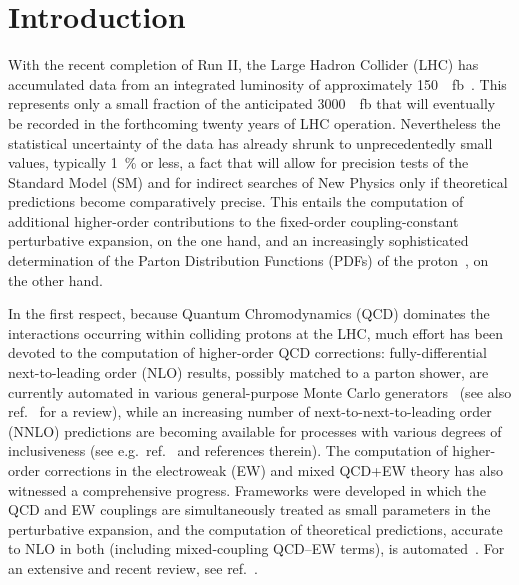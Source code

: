 \section{Introduction}
\label{sec:introduction}

With the recent completion of Run II, the Large Hadron Collider (LHC) has 
accumulated data from an integrated luminosity of approximately 
\SI{150}{\per\femto\barn}~\cite{Mangano:2020icy}. This represents only a small fraction of
the anticipated \SI{3000}{\per\femto\barn} that will eventually be recorded in the
forthcoming twenty years of LHC operation. Nevertheless the statistical 
uncertainty of the data has already shrunk to unprecedentedly small values,
typically \SI{1}{\percent} or less, a fact that will allow for precision tests of the
Standard Model (SM) and for indirect searches of New Physics only if 
theoretical predictions become comparatively precise. This entails the 
computation of additional higher-order contributions to the fixed-order 
coupling-constant perturbative expansion, on the one hand, and an increasingly 
sophisticated determination of the Parton Distribution Functions (PDFs) of the 
proton~\cite{Gao:2017yyd,Ethier:2020way}, on the other hand. 

In the first respect, because Quantum Chromodynamics (QCD) dominates the 
interactions occurring within colliding protons at the LHC, much effort 
has been devoted to the computation of higher-order QCD corrections: 
fully-differential next-to-leading order (NLO) results, possibly matched to a
parton shower, are currently automated in various general-purpose
Monte Carlo generators~\cite{Gleisberg:2008ta,Alwall:2014hca,Bellm:2015jjp}
(see also ref.~\cite{Buckley:2011ms} for a review),
while an increasing number of next-to-next-to-leading order (NNLO) predictions 
are becoming available for processes with various degrees of inclusiveness
(see e.g.\ ref.~\cite{Amoroso:2020lgh} and references therein). The computation
of higher-order corrections in the electroweak (EW) and mixed QCD+EW theory has
also witnessed a comprehensive progress. Frameworks 
were developed in which the QCD and EW couplings are simultaneously treated as 
small parameters in the perturbative expansion, and the computation of 
theoretical predictions, accurate to NLO in both (including mixed-coupling 
QCD--EW terms), is automated~\cite{Kallweit:2014xda,Biedermann:2017yoi,Frederix:2018nkq}. For an extensive and recent review, see ref.~\cite{Denner:2019vbn}.

